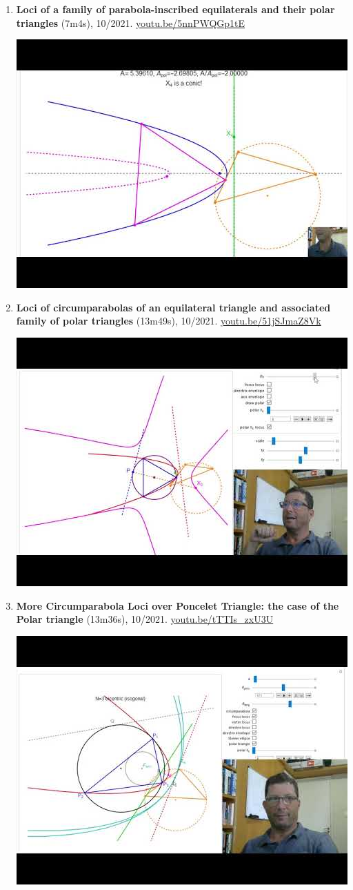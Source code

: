 \documentclass[12pt]{article}
\begin{document}
\begin{enumerate}[resume]
% 
\item \textbf{Loci of a family of parabola-inscribed equilaterals and their polar triangles} (7m4s), 10/2021. \href{https://youtu.be/5nnPWQGp1tE}{\url{youtu.be/5nnPWQGp1tE}}
\begin{center}\includegraphics[width=.5\textwidth]{pics/5nnPWQGp1tE.jpg}\end{center}
% 
\item \textbf{Loci of circumparabolas of an equilateral triangle and associated family of polar triangles} (13m49s), 10/2021. \href{https://youtu.be/51jSJmaZ8Vk}{\url{youtu.be/51jSJmaZ8Vk}}
\begin{center}\includegraphics[width=.5\textwidth]{pics/51jSJmaZ8Vk.jpg}\end{center}
% 
\item \textbf{More Circumparabola Loci over Poncelet Triangle: the case of the Polar triangle} (13m36s), 10/2021. \href{https://youtu.be/tTTIs_zxU3U}{\url{youtu.be/tTTIs\_zxU3U}}
\begin{center}\includegraphics[width=.5\textwidth]{pics/tTTIs_zxU3U.jpg}\end{center}

\end{enumerate}
\end{document}
